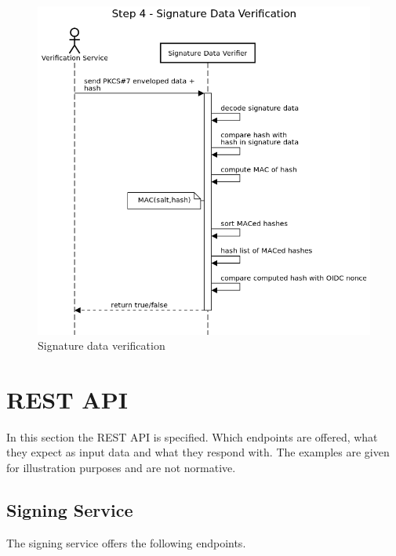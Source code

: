 \begin{figure}[H]
    \begin{center}
        \includegraphics[scale=0.5]{images/protocol_verification_step4_signature_data.png}
        \caption{Signature data verification}
        \label{fig:signaturedataverification}
    \end{center}
\end{figure}

\section{REST API}\label{sec:rest-api}

In this section the \gls{REST} \gls{API} is specified.
Which endpoints are offered, what they expect as input data and what they respond with.
The examples are given for illustration purposes and are not normative.

\subsection{Signing Service}\label{subsec:signing-service}
The signing service offers the following endpoints.

